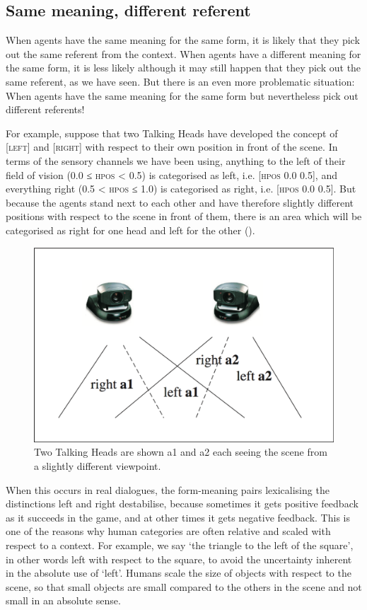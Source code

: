 \subsection{Same meaning, different referent} 

When agents have the same meaning for the same
form, it is likely that they
pick out the same referent from the context. When agents
have a different meaning for the same form, it is less 
likely although it may still happen that they pick 
out the same referent, as we have seen. But there 
is an even more problematic situation: When agents have the 
same meaning for the same form but nevertheless pick out 
different referents! 

For example, suppose that two Talking Heads have developed the 
concept of [\textsc{left}] and [\textsc{right}] with respect to their own position 
in front of the scene. In terms of the sensory 
channels we have been using, anything to the left of their field  
of vision (0.0 ≤ \textsc{hpos} < 0.5) is categorised as
left, i.e. [\textsc{hpos} 0.0 0.5], and everything right  
(0.5 < \textsc{hpos} ≤ 1.0) is categorised as right, 
i.e. [\textsc{hpos} 0.0 0.5]. But because the
agents stand next to each other and have therefore 
slightly different positions with respect to the 
scene in front of them, there is an area which will 
be categorised as right for one head and left for the other ().

\begin{figure}[htbp]
  \centerline{\includegraphics[width=.65\textwidth]{chap2/figs/left-right.pdf}}
\caption{\label{2:left-right}Two Talking Heads are shown {\bfshape a1} and 
{\bfshape a2} each seeing the scene from a slightly different viewpoint.}
\end{figure}
When this occurs in real dialogues, the form-meaning 
pairs lexicalising the distinctions left and right destabilise,
because sometimes it gets positive feedback as 
it succeeds in the game, and at other times it 
gets negative feedback. 
This is one of the reasons why human categories are often 
relative and scaled with respect to a context.
For example, we say `the triangle to the left of the square', in 
other words left with respect to the square, to avoid the uncertainty
inherent in the absolute use of `left'. Humans scale the size 
of objects with respect to the scene, so that small 
objects are small compared to the others in the scene 
and not small in an absolute sense. 

